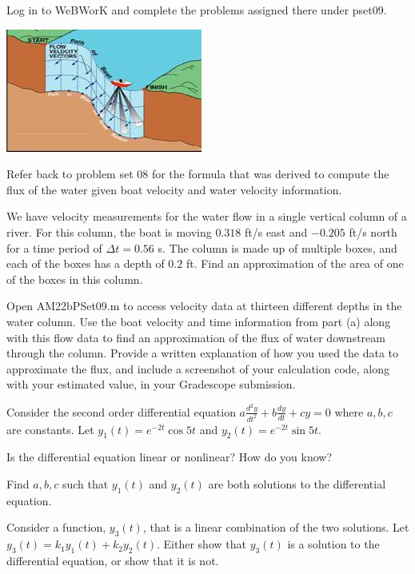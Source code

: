 \documentclass[12pt,letterpaper,noanswers]{exam}
\begin{document}
 \pdfpageheight 11in 
  \pdfpagewidth 8.5in
  

\begin{questions}
\question Log in to WeBWorK and complete the problems assigned there under pset09.

\question \includegraphics{img/S20pset08USGS.png}

Refer back to problem set 08 for the formula that was derived to compute the flux of the water given boat velocity and water velocity information.

\begin{parts}
\item We have velocity measurements for the water flow in a single vertical column of a river.  For this column, the boat is moving $0.318$ ft/s east and $-0.205$ ft/s north for a time period of $\Delta t = 0.56$ s.  The column is made up of multiple boxes, and each of the boxes has a depth of $0.2$ ft.  Find an approximation of the area of one of the boxes in this column.
\item Open AM22bPSet09.m to access velocity data at thirteen different depths in the water column.  Use the boat velocity and time information from part (a) along with this flow data to find an approximation of the flux of water downstream through the column.  Provide a written explanation of how you used the data to approximate the flux, and include a screenshot of your calculation code, along with your estimated value, in your Gradescope submission.
\end{parts}



\question Consider the second order differential equation $a\frac{d^2y}{dt^2} + b\frac{dy}{dt} + cy = 0$ where $a,b,c$ are constants.  Let $y_1(t) = e^{-2t}\cos 5t$ and $y_2(t) = e^{-2t}\sin 5t$.
\begin{parts}
\item Is the differential equation linear or nonlinear?  How do you know?
\item Find $a,b,c$ such that $y_1(t)$ and $y_2(t)$ are both solutions to the differential equation.
\item Consider a function, $y_3(t)$, that is a linear combination of the two solutions.  Let $y_3(t) = k_1 y_1(t) + k_2 y_2(t)$.  Either show that $y_3(t)$ is a solution to the differential equation, or show that it is not.
\end{parts} 






\end{questions}
\end{document}
